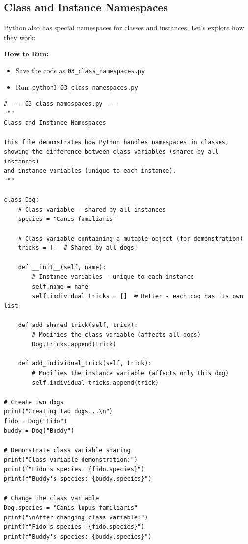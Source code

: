 \documentclass[12pt,letterpaper]{article}
\newenvironment{macterminal}{%
    \begin{mdframed}[
        linecolor=terminalFrame,
        backgroundcolor=terminalBg,
        roundcorner=5pt,
        skipabove=5pt,
        skipbelow=5pt,
        linewidth=1pt,
        innertopmargin=5pt,
        frametitle={%
            \tikz[baseline=(current bounding box.east), outer sep=0pt]{
                \fill[red!80!black] (0,0) circle (5pt);
                \fill[yellow!80!black] (0.7,0) circle (5pt);
                \fill[green!70!black] (1.4,0) circle (5pt);
            }
        },
        frametitlealignment=\raggedright,
        frametitleaboveskip=8pt,
        frametitlebelowskip=0pt,
    ]
}{%
    \end{mdframed}%
}
\begin{document}
\subsection{Class and Instance Namespaces}

Python also has special namespaces for classes and instances. Let's explore how they work:

\textbf{How to Run:}
\begin{itemize}
    \item Save the code as \verb|03_class_namespaces.py|
    \item Run: \verb|python3 03_class_namespaces.py|
\end{itemize}

\begin{macterminal}
\begin{lstlisting}
# --- 03_class_namespaces.py ---
"""
Class and Instance Namespaces

This file demonstrates how Python handles namespaces in classes,
showing the difference between class variables (shared by all instances)
and instance variables (unique to each instance).
"""

class Dog:
    # Class variable - shared by all instances
    species = "Canis familiaris"
    
    # Class variable containing a mutable object (for demonstration)
    tricks = []  # Shared by all dogs!
    
    def __init__(self, name):
        # Instance variables - unique to each instance
        self.name = name
        self.individual_tricks = []  # Better - each dog has its own list
    
    def add_shared_trick(self, trick):
        # Modifies the class variable (affects all dogs)
        Dog.tricks.append(trick)
    
    def add_individual_trick(self, trick):
        # Modifies the instance variable (affects only this dog)
        self.individual_tricks.append(trick)

# Create two dogs
print("Creating two dogs...\n")
fido = Dog("Fido")
buddy = Dog("Buddy")

# Demonstrate class variable sharing
print("Class variable demonstration:")
print(f"Fido's species: {fido.species}")
print(f"Buddy's species: {buddy.species}")

# Change the class variable
Dog.species = "Canis lupus familiaris"
print("\nAfter changing class variable:")
print(f"Fido's species: {fido.species}")
print(f"Buddy's species: {buddy.species}")


\end{lstlisting}
\end{macterminal}
\end{document}
